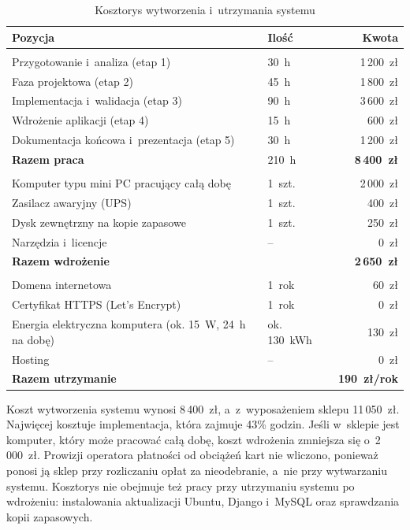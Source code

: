 \documentclass[12pt,a4paper,oneside]{article}
\newcounter{pu}
\begin{document}
\begin{table}[H]
	\centering
	\caption{Kosztorys wytworzenia i~utrzymania systemu}
	\label{tab:koszt}
	\small
	\begin{tabularx}{\textwidth}{@{}>{\raggedright\arraybackslash}XL{3.0cm}r@{}}
		\toprule
		Pozycja & Ilość & Kwota \\
		\midrule
		 \\
		Przygotowanie i~analiza (etap 1) & 30~h & 1\,200~zł \\
		Faza projektowa (etap 2) & 45~h & 1\,800~zł \\
		Implementacja i~walidacja (etap 3) & 90~h & 3\,600~zł \\
		Wdrożenie aplikacji (etap 4) & 15~h & 600~zł \\
		Dokumentacja końcowa i~prezentacja (etap 5) & 30~h & 1\,200~zł \\
		\textbf{Razem praca} & 210~h & \textbf{8\,400~zł} \\
		\midrule
		 \\
		Komputer typu mini PC pracujący całą dobę & 1~szt. & 2\,000~zł \\
		Zasilacz awaryjny (UPS) & 1~szt. & 400~zł \\
		Dysk zewnętrzny na kopie zapasowe & 1~szt. & 250~zł \\
		Narzędzia i~licencje & -- & 0~zł \\
		\textbf{Razem wdrożenie} & & \textbf{2\,650~zł} \\
		\midrule
		 \\
		Domena internetowa & 1~rok & 60~zł \\
		Certyfikat HTTPS (Let's Encrypt) & 1~rok & 0~zł \\
		Energia elektryczna komputera (ok. 15~W, 24~h na dobę) & ok. 130~kWh & 130~zł \\
		Hosting & -- & 0~zł \\
		\textbf{Razem utrzymanie} & & \textbf{190~zł/rok} \\
		\bottomrule
	\end{tabularx}
\end{table}

Koszt wytworzenia systemu wynosi 8\,400~zł, a~z~wyposażeniem sklepu 11\,050~zł. Najwięcej kosztuje implementacja, która zajmuje 43\% godzin. Jeśli w~sklepie jest komputer, który może pracować całą dobę, koszt wdrożenia zmniejsza się o~2\,000~zł. Prowizji operatora płatności od obciążeń kart nie wliczono, ponieważ ponosi ją sklep przy rozliczaniu opłat za nieodebranie, a~nie przy wytwarzaniu systemu. Kosztorys nie obejmuje też pracy przy utrzymaniu systemu po wdrożeniu: instalowania aktualizacji Ubuntu, Django i~MySQL oraz sprawdzania kopii zapasowych.
\end{document}
